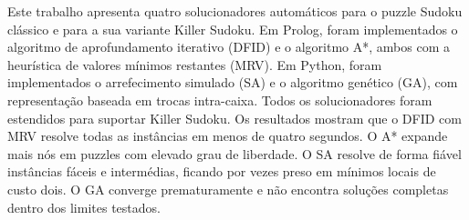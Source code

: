 \abstractPT  %

Este trabalho apresenta quatro solucionadores automáticos para o puzzle Sudoku clássico e para a sua variante Killer Sudoku. Em Prolog, foram implementados o algoritmo de aprofundamento iterativo (DFID) e o algoritmo A*, ambos com a heurística de valores mínimos restantes (MRV). Em Python, foram implementados o arrefecimento simulado (SA) e o algoritmo genético (GA), com representação baseada em trocas intra-caixa. Todos os solucionadores foram estendidos para suportar Killer Sudoku. Os resultados mostram que o DFID com MRV resolve todas as instâncias em menos de quatro segundos. O A* expande mais nós em puzzles com elevado grau de liberdade. O SA resolve de forma fiável instâncias fáceis e intermédias, ficando por vezes preso em mínimos locais de custo dois. O GA converge prematuramente e não encontra soluções completas dentro dos limites testados.

